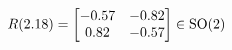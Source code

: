 \documentclass[preview]{standalone}
\begin{document}
\begin{align*}
\special{dvisvgm:raw <g id='unique000'>}R(2.18) = \begin{bmatrix} -0.57 & -0.82 \\ 0.82 & -0.57 \end{bmatrix} \in \text{SO}(2)\special{dvisvgm:raw </g>}
\end{align*}
\end{document}

